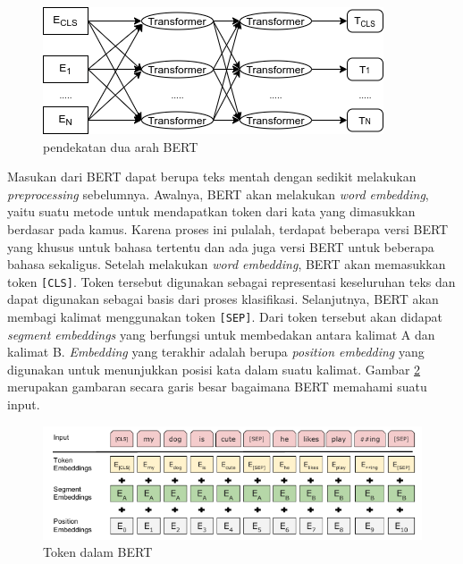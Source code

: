 \begin{figure}[h]
    \begin{center}
        \includegraphics[width= .8\linewidth]{gambar/bert_archi_base.png}
        \caption{pendekatan dua arah BERT}
        \label{fig: bidirectionalBert}
    \end{center}
\end{figure}

Masukan dari BERT dapat berupa teks mentah dengan sedikit melakukan \textit{preprocessing} sebelumnya. Awalnya, BERT akan melakukan \textit{word embedding}, yaitu suatu metode untuk mendapatkan token dari kata yang dimasukkan berdasar pada kamus. Karena proses ini pulalah, terdapat beberapa versi BERT yang khusus untuk bahasa tertentu dan ada juga versi BERT untuk beberapa bahasa sekaligus. Setelah melakukan \textit{word embedding}, BERT akan memasukkan token \texttt{[CLS]}. Token tersebut digunakan sebagai representasi keseluruhan teks dan dapat digunakan sebagai basis dari proses klasifikasi. Selanjutnya, BERT akan membagi kalimat menggunakan token \texttt{[SEP]}. Dari token tersebut akan didapat \textit{segment embeddings} yang berfungsi untuk membedakan antara kalimat A dan kalimat B. \textit{Embedding} yang terakhir adalah berupa \textit{position embedding} yang digunakan untuk menunjukkan posisi kata dalam suatu kalimat. Gambar \ref{fig: bertToken} merupakan gambaran secara garis besar bagaimana BERT memahami suatu input.

\begin{figure}[h!]
    \begin{center}
        \includegraphics[width= 0.9\linewidth]{gambar/bert.png}
        \caption{Token dalam BERT \cite{devlin2019bert}}
        \label{fig: bertToken}
    \end{center}
\end{figure}

